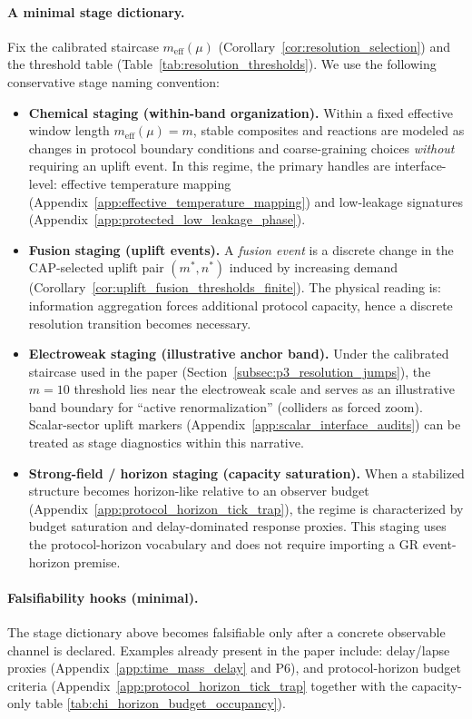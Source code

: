 \paragraph{A minimal stage dictionary.}
\InterfaceTag Fix the calibrated staircase $m_{\mathrm{eff}}(\mu)$ (Corollary~\ref{cor:resolution_selection}) and the threshold table (Table~\ref{tab:resolution_thresholds}).
We use the following conservative stage naming convention:
\begin{itemize}
\item \textbf{Chemical staging (within-band organization).}
Within a fixed effective window length $m_{\mathrm{eff}}(\mu)=m$, stable composites and reactions are modeled as changes in protocol boundary conditions and coarse-graining choices \emph{without} requiring an uplift event.
In this regime, the primary handles are interface-level: effective temperature mapping (Appendix~\ref{app:effective_temperature_mapping}) and low-leakage signatures (Appendix~\ref{app:protected_low_leakage_phase}).
\item \textbf{Fusion staging (uplift events).}
A \emph{fusion event} is a discrete change in the CAP-selected uplift pair $(m^\ast,n^\ast)$ induced by increasing demand (Corollary~\ref{cor:uplift_fusion_thresholds_finite}).
The physical reading is: information aggregation forces additional protocol capacity, hence a discrete resolution transition becomes necessary.
\item \textbf{Electroweak staging (illustrative anchor band).}
Under the calibrated staircase used in the paper (Section~\ref{subsec:p3_resolution_jumps}), the $m=10$ threshold lies near the electroweak scale and serves as an illustrative band boundary for ``active renormalization'' (colliders as forced zoom).
Scalar-sector uplift markers (Appendix~\ref{app:scalar_interface_audits}) can be treated as stage diagnostics within this narrative.
\item \textbf{Strong-field / horizon staging (capacity saturation).}
When a stabilized structure becomes horizon-like relative to an observer budget (Appendix~\ref{app:protocol_horizon_tick_trap}), the regime is characterized by budget saturation and delay-dominated response proxies.
This staging uses the protocol-horizon vocabulary and does not require importing a GR event-horizon premise.
\end{itemize}

\paragraph{Falsifiability hooks (minimal).}
\AuditTag The stage dictionary above becomes falsifiable only after a concrete observable channel is declared.
Examples already present in the paper include:
delay/lapse proxies (Appendix~\ref{app:time_mass_delay} and P6),
and protocol-horizon budget criteria (Appendix~\ref{app:protocol_horizon_tick_trap} together with the capacity-only table \ref{tab:chi_horizon_budget_occupancy}).

